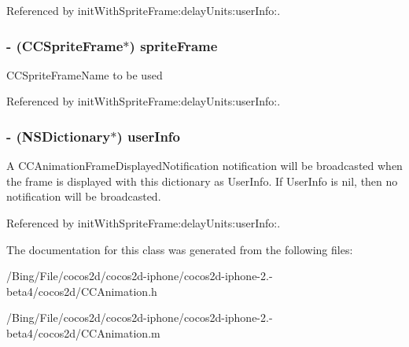 Referenced by init\-With\-Sprite\-Frame\-:delay\-Units\-:user\-Info\-:.

\hypertarget{interface_c_c_animation_frame_a42391105614626578802667da59120fc}{
\subsubsection[{sprite\-Frame}]{\setlength{\rightskip}{0pt plus 5cm}-\/ ({\bf C\-C\-Sprite\-Frame}$\ast$) {\bf sprite\-Frame}}}\label{interface_c_c_animation_frame_a42391105614626578802667da59120fc}
C\-C\-Sprite\-Frame\-Name to be used 

Referenced by init\-With\-Sprite\-Frame\-:delay\-Units\-:user\-Info\-:.

\hypertarget{interface_c_c_animation_frame_a9eb75cd1e56aafd7d4041ca0a50598b4}{
\subsubsection[{user\-Info}]{\setlength{\rightskip}{0pt plus 5cm}-\/ (N\-S\-Dictionary$\ast$) {\bf user\-Info}}}\label{interface_c_c_animation_frame_a9eb75cd1e56aafd7d4041ca0a50598b4}
A C\-C\-Animation\-Frame\-Displayed\-Notification notification will be broadcasted when the frame is displayed with this dictionary as User\-Info. If User\-Info is nil, then no notification will be broadcasted. 

Referenced by init\-With\-Sprite\-Frame\-:delay\-Units\-:user\-Info\-:.



The documentation for this class was generated from the following files\-:\begin{DoxyCompactItemize}
\item 
/\-Bing/\-File/cocos2d/cocos2d-\/iphone/cocos2d-\/iphone-\/2.-\/beta4/cocos2d/C\-C\-Animation.\-h\item 
/\-Bing/\-File/cocos2d/cocos2d-\/iphone/cocos2d-\/iphone-\/2.-\/beta4/cocos2d/C\-C\-Animation.\-m\end{DoxyCompactItemize}
